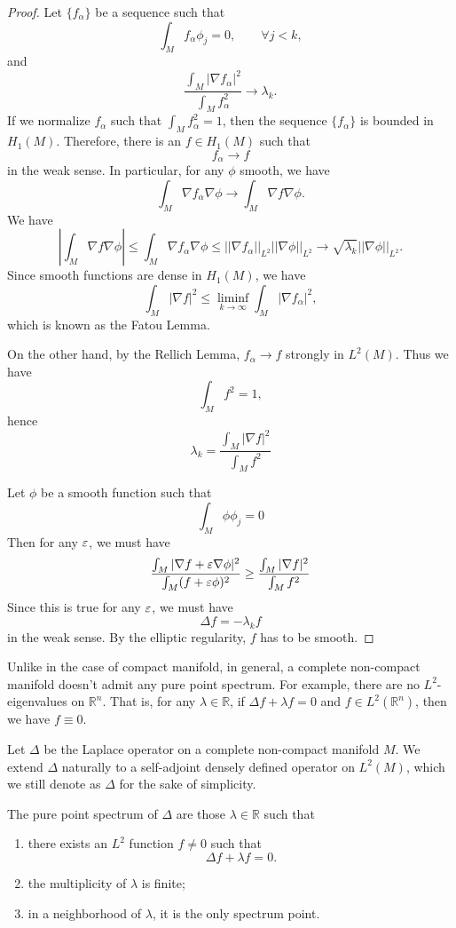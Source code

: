 \begin{proof} Let $\{ f_\alpha\}$ be a sequence such that 
\[
\int_M f_\alpha\phi_j=0, \qquad \forall j<k,
\]
and
\[
\frac{\int_M|\nabla f_\alpha|^2}{\int_M f_\alpha^2}\to\lambda_k.
\]
If we normalize $f_\alpha$ such that $\int_M f_\alpha^2=1$, then the sequence $\{f_\alpha\}$ is bounded in $H_1(M)$. Therefore, there is an $f\in H_1(M)$ such that
\[
f_\alpha\to f
\]
in the weak sense. In particular, for any $\phi$ smooth, we have
\[
\int_M\nabla f_\alpha\nabla\phi\to\int_M\nabla f\nabla\phi.
\]
We have
\[
\left|\int_M\nabla f\nabla\phi\right|\leq\int_M\nabla f_\alpha\nabla\phi\leq ||\nabla f_\alpha||_{L^2}||\nabla\phi||_{L^2}\to\sqrt{\lambda_k}||\nabla\phi||_{L^2}.
\]
Since smooth functions are dense in $H_1(M)$, we have
\[
\int_M|\nabla f|^2\leq\liminf_{k\to\infty}\int_M|\nabla f_\alpha|^2,
\]
which is known as the Fatou Lemma.

On the other hand, by the Rellich Lemma, $f_\alpha\to f$ strongly in $L^2(M)$. Thus we have
\[
\int_Mf^2=1,
\]
hence
\[
\lambda_k=\frac{\int_M|\nabla f|^2}{\int_M f^2}
\]

Let $\phi$ be a smooth function such that 
\[
\int_M\phi\phi_j=0
\]
Then for any $\varepsilon$, we must have
\[
\frac{\int_M|\nabla f+\varepsilon\nabla\phi|^2}{\int_M (f+\varepsilon\phi)^2}\geq\frac{\int_M|\nabla f|^2}{\int_M f^2}
\]
Since this is true for any $\varepsilon$, we must have
\[
\Delta f=-\lambda_k f
\]
in the weak sense. By the elliptic regularity, $f$ has to be smooth.

\end{proof}



Unlike in the case of compact manifold, in general, a complete non-compact  manifold doesn't admit any pure point spectrum. For example, there are no $L^2$-eigenvalues on $\mathbb R^n$. That is, for any $\lambda\in\mathbb R$, if $\Delta f+\lambda f=0$ and $f\in L^2(\mathbb R^n)$, then we have $f\equiv 0$.



Let $\Delta$ be the Laplace operator on a complete non-compact manifold $M$.  We extend $\Delta$ naturally  to a self-adjoint densely defined operator on $L^2(M)$, which we still denote as $\Delta$ for the sake of simplicity.





The pure point spectrum of $\Delta$ are those  $\lambda\in\mathbb R$ such that 
\begin{enumerate}
\item there exists an $L^2$ function $f\neq 0$ such that 
\[
\Delta f+\lambda f=0.
\]
\item the multiplicity of $\lambda$ is finite;
\item in a neighborhood of $\lambda$, it is the only spectrum point.
\end{enumerate}

